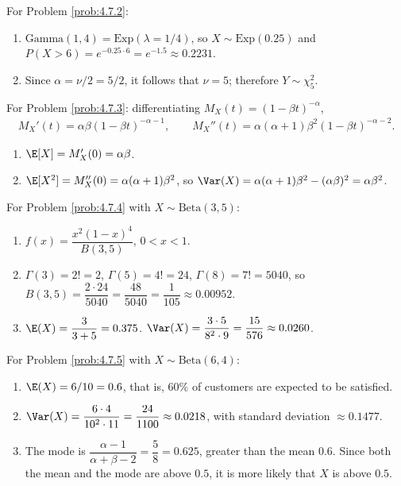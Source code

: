 \begin{solucion}
	\label{sol:4.7.2}
	For Problem \ref{prob:4.7.2}:
	\begin{enumerate}
		\item $\text{Gamma}(1,4) = \text{Exp}(\lambda=1/4)$, so $X\sim\text{Exp}(0.25)$ and $P(X>6) = e^{-0.25\cdot 6} = e^{-1.5} \approx 0.2231$.
		\item Since $\alpha=\nu/2=5/2$, it follows that $\nu=5$; therefore $Y \sim \chi^{2}_{5}$. \quad \qedhere
	\end{enumerate}
\end{solucion}

\begin{solucion}
	\label{sol:4.7.3}
	For Problem \ref{prob:4.7.3}: differentiating $M_X(t)=(1-\beta t)^{-\alpha}$,
	\begin{align*}
		M_X'(t) = \alpha\beta(1-\beta t)^{-\alpha-1}, \qquad M_X''(t) = \alpha(\alpha+1)\beta^{2}(1-\beta t)^{-\alpha-2}.
	\end{align*}
	\begin{enumerate}
		\item $\E[X] = M_X'(0) = \alpha\beta$.
		\item $\E[X^{2}] = M_X''(0) = \alpha(\alpha+1)\beta^{2}$, so $\Var(X) = \alpha(\alpha+1)\beta^{2} - (\alpha\beta)^{2} = \alpha\beta^{2}$. \quad \qedhere
	\end{enumerate}
\end{solucion}

\begin{solucion}
	\label{sol:4.7.4}
	For Problem \ref{prob:4.7.4} with $X \sim \text{Beta}(3,5)$:
	\begin{enumerate}
		\item $f(x) = \dfrac{x^{2}(1-x)^{4}}{B(3,5)}$, $0<x<1$.
		\item $\Gamma(3)=2!=2$, $\Gamma(5)=4!=24$, $\Gamma(8)=7!=5040$, so $B(3,5) = \dfrac{2\cdot 24}{5040} = \dfrac{48}{5040} = \dfrac{1}{105} \approx 0.00952$.
		\item $\E(X) = \dfrac{3}{3+5} = 0.375$. $\Var(X) = \dfrac{3\cdot 5}{8^{2}\cdot 9} = \dfrac{15}{576} \approx 0.0260$. \quad \qedhere
	\end{enumerate}
\end{solucion}

\begin{solucion}
	\label{sol:4.7.5}
	For Problem \ref{prob:4.7.5} with $X \sim \text{Beta}(6,4)$:
	\begin{enumerate}
		\item $\E(X) = 6/10 = 0.6$, that is, $60\%$ of customers are expected to be satisfied.
		\item $\Var(X) = \dfrac{6\cdot 4}{10^{2}\cdot 11} = \dfrac{24}{1100} \approx 0.0218$, with standard deviation $\approx 0.1477$.
		\item The mode is $\dfrac{\alpha-1}{\alpha+\beta-2} = \dfrac{5}{8} = 0.625$, greater than the mean $0.6$. Since both the mean and the mode are above $0.5$, it is more likely that $X$ is above $0.5$. \quad \qedhere
	\end{enumerate}
\end{solucion}


